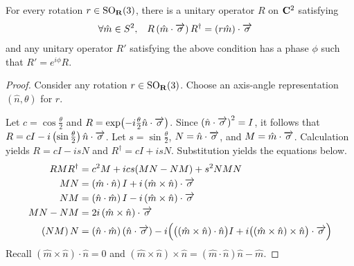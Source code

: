 \begin{lemma}
	For every rotation $r \in \operatorname{SO}_{\mathbf{R}}\!\left(3\right)$, there is a unitary operator $R$ on $\mathbf{C}^2$ satisfying
	\begin{align*}
		\forall \hat{m} & \in S^2, & R \left(\hat{m} \cdot \overrightarrow{\sigma}\right) R^\dagger & = \left(r \hat{m}\right) \cdot \overrightarrow{\sigma}
	\end{align*}
	and any unitary operator $R'$ satisfying the above condition has a phase $\phi$ such that $R' = e^{i \phi} R$.
\end{lemma}
\begin{proof}
	Consider any rotation $r \in \operatorname{SO}_{\mathbf{R}}\!\left(3\right)$.
	Choose an axis-angle representation $\left(\hat{n}, \theta\right)$ for $r$.

	Let $c = \cos \frac{\theta}{2}$ and $R = \exp\!\left(- i \frac{\theta}{2} \hat{n} \cdot \overrightarrow{\sigma}\right)$.
	Since $\left(\hat{n} \cdot \overrightarrow{\sigma}\right)^2 = I$, it follows that $R = c I - i \left(\sin \frac{\theta}{2}\right) \hat{n} \cdot \overrightarrow{\sigma}$.
	Let $s = \sin \frac{\theta}{2}$, $N = \hat{n} \cdot \overrightarrow{\sigma}$, and $M = \hat{m} \cdot \overrightarrow{\sigma}$.
	Calculation yields $R = c I - i s N$ and $R^\dagger = c I + i s N$.
	Substitution yields the equations below.
	\begin{align*}
		R M R^\dagger    & = c^2 M + ics(M N - N M) + s^2 N M N                                                                                                                                                                      \\
		MN               & = \left(\hat{m} \cdot \hat{n}\right) I + i \left(\hat{m} \times \hat{n}\right) \cdot \overrightarrow{\sigma}                                                                                                                \\
		NM               & = \left(\hat{n} \cdot \hat{m}\right) I -  i \left(\hat{m} \times \hat{n}\right) \cdot \overrightarrow{\sigma}                                                                                                               \\
		MN - NM          & = 2 i \left(\hat{m} \times \hat{n}\right) \cdot \overrightarrow{\sigma}                                                                                                                                                     \\
		\left(NM\right)N & = \left(\hat{n} \cdot \hat{m}\right) \left(\hat{n} \cdot \overrightarrow{\sigma}\right)  - i \Big(\big((\hat{m} \times \hat{n}) \cdot \hat{n}\big) I + i \big((\hat{m} \times \hat{n}) \times \hat{n}\big) \cdot \overrightarrow{\sigma}\Big)
	\end{align*}
	Recall $\left(\hat{m} \times \hat{n}\right) \cdot \hat{n} = 0$ and $\left(\hat{m} \times \hat{n}\right) \times \hat{n} = \left(\hat{m} \cdot \hat{n}\right) \hat{n} - \hat{m}$.

\end{proof}
